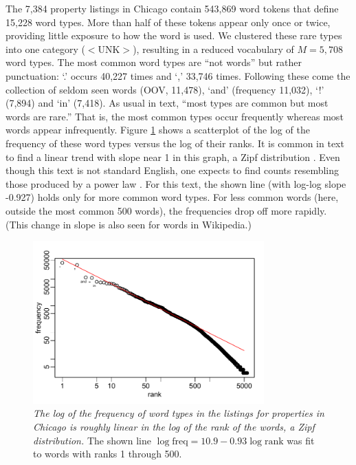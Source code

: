 \documentclass[12pt]{article}
\begin{document}
 The 7,384 property listings in Chicago contain 543,869 word tokens that define
 15,228 word types.  More than half of these tokens appear only once or twice,
 providing little exposure to how the word is used.  We clustered these
 rare types into one category ($<$UNK$>$), resulting in a reduced vocabulary of
 $M = 5,708$ word types.  The most common word types are ``not words'' but
 rather punctuation: `.'  occurs 40,227 times and `,' 33,746 times.  Following
 these come the collection of seldom seen words (OOV, 11,478), `and' (frequency 11,032), `!' (7,894) and `in' (7,418).    As usual in text, ``most types are common but most words are rare.''  That is, the most common types occur frequently whereas most words appear infrequently.  Figure \ref{fig:zipf} shows a scatterplot of the log of the frequency of these word types versus the log of their ranks.  It is common in text to find a linear trend with slope near 1 in this graph, a Zipf distribution \citep{zipf35, baayen02}.  Even though this text is not standard English, one expects to find counts resembling those produced by a power law \citep{clauset09}.  For
 this text, the shown line (with log-log slope -0.927) holds only for more
 common word types.  For less common words (here, outside the most common 500
 words), the frequencies drop off more rapidly.  (This change in slope is also
 seen for words in Wikipedia.)


 \begin{figure}
 \caption{ \label{fig:zipf} { \sl The log of the frequency of word types in the
 listings for properties in Chicago is roughly linear in the log of the rank of
 the words, a Zipf distribution.}  The shown line $\log \mbox{freq} = 10.9 -
 0.93 \log \mbox{rank}$ was fit to words with ranks 1 through 500.  }

 \centerline{
 \vspace{0.1in}
 \includegraphics[width=3.5in]{figures/zipf} }
 \vspace{0.2in}
 \end{figure}
\end{document}
